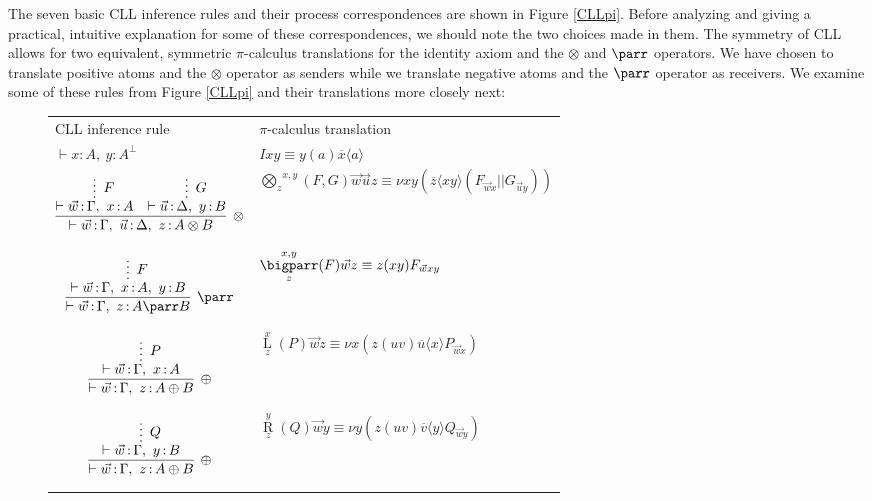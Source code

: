 \documentclass[copyright,creativecommons]{eptcs}
\DeclareMathOperator{\plusL}{L}
\DeclareMathOperator{\plusR}{R}
\DeclareMathOperator{\cln}{:}
\begin{document}
The seven basic CLL inference rules and their process correspondences are shown in Figure \ref{CLLpi}. Before analyzing and giving a practical, intuitive explanation for some of these correspondences, we should note the two choices made in them. The symmetry of CLL allows for two equivalent, symmetric $\pi$-calculus translations for the identity axiom and the $\otimes$ and $\parr$ operators. We have chosen to translate positive atoms and the $\otimes$ operator as senders while we translate negative atoms and the $\parr$ operator as receivers. We examine some of these rules from Figure \ref{CLLpi} and their translations more closely next:

\begin{figure}[htb]
	\centering
	\footnotesize
		\begin{tabular}{>{\centering\arraybackslash}m{.4\linewidth} >{\centering\arraybackslash}m{.55\linewidth}}
		CLL inference rule & $\pi$-calculus translation \\
		\vspace*{3mm}
		$\vdash x \cln A,\ y \cln A^\bot$ & $Ixy\equiv y(a)\overline{x}\langle a \rangle$ \\
		\vspace*{-5mm}
		$$
		\infer[\otimes]{\vdash \vec{w} \cln \Gamma,\ \vec{u} \cln \Delta,\ z \cln A\otimes B}{
		\infer*[F]{\vdash \vec{w} \cln \Gamma,\ x \cln A}{}
		&
		\infer*[G]{\vdash \vec{u} \cln \Delta,\ y \cln B}{}
		}
		$$ & 
		$\overset{x,y}{\underset{z}{\bigotimes}}(F,G)\vec{w}\vec{u}z \equiv \nu x y (\overline{z}\langle xy \rangle(F_{\vec{w}x} || G_{\vec{u}y}))$ \\
		\vspace*{-7mm}
		$$
		\infer[\parr]{\vdash \vec{w} \cln \Gamma,\ z \cln A \parr B}{
		\infer*[F]{\vdash \vec{w} \cln \Gamma,\ x \cln A,\ y \cln B}{}
		}
		$$ & $\overset{x,y}{\underset{z}{\bigparr}}(F)\vec{w}z \equiv z(xy)F_{\vec{w}xy}$ \\
		\vspace*{-7mm}
		$$
		\infer[\oplus]{\vdash \vec{w} \cln \Gamma,\ z \cln A \oplus B}{
		\infer*[P]{\vdash \vec{w} \cln \Gamma,\ x \cln A}{}
		}
		$$ & $\overset{x}{\underset{z}{\plusL}}(P)\vec{w}z \equiv \nu x (z(uv)\overline{u}\langle x \rangle P_{\vec{w}x})$ \\
		\vspace*{-7mm}
		$$
		\infer[\oplus]{\vdash \vec{w} \cln \Gamma,\ z \cln A \oplus B}{
		\infer*[Q]{\vdash \vec{w} \cln \Gamma,\ y \cln B}{}
		}
		$$ & $\overset{y}{\underset{z}{\plusR}}(Q)\vec{w}y \equiv \nu y (z(uv)\overline{v}\langle y \rangle Q_{\vec{w}y})$ \\

\end{tabular}
\end{figure}
\end{document}
